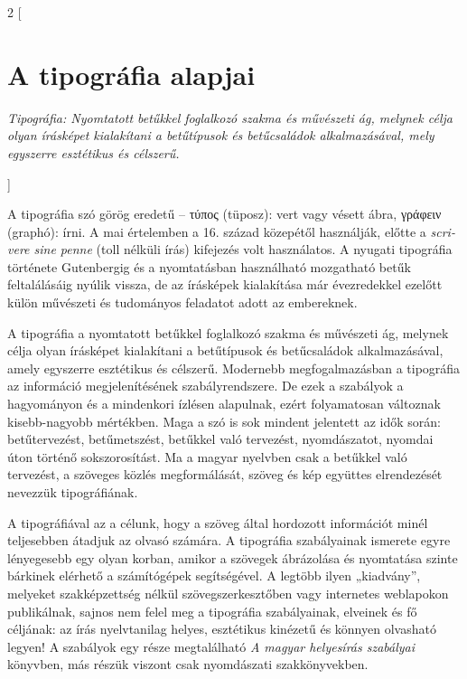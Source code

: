 \documentclass[]{article}
\begin{document}
\begin{multicols}{2}
[
\section{A tipográfia alapjai}
\centering\parbox{0.75\textwidth}{\emph{Tipográfia: Nyomtatott betűkkel foglalkozó szakma és művészeti ág, melynek célja olyan írásképet kialakítani a betűtípusok és betűcsaládok alkalmazásával, mely egyszerre esztétikus és célszerű.}}
]
\justify

A tipográfia szó görög eredetű -- \foreignlanguage{greek}{τύπος} (tüposz): vert vagy vésett ábra, \foreignlanguage{greek}{γράφειν} (graphó): írni. A mai értelemben a 16. század közepétől használják, előtte a \emph{\foreignlanguage{italian}{scrivere sine penne}} (toll nélküli írás) kifejezés volt használatos. A nyugati tipográfia története Gutenbergig és a nyomtatásban használható mozgatható betűk feltalálásáig nyúlik vissza, de az írásképek kialakítása már évezredekkel ezelőtt külön művészeti és tudományos feladatot adott az embereknek.

A tipográfia a nyomtatott betűkkel foglalkozó szakma és művészeti ág, melynek célja olyan írásképet kialakítani a betűtípusok és betűcsaládok alkalmazásával, amely egyszerre esztétikus és célszerű. Modernebb megfogalmazásban a tipográfia az információ megjelenítésének szabályrendszere. De ezek a szabályok a hagyományon és a mindenkori ízlésen alapulnak, ezért folyamatosan változnak kisebb-nagyobb mértékben. Maga a szó is sok mindent jelentett az idők során: betűtervezést, betűmetszést, betűkkel való tervezést, nyomdászatot, nyomdai úton történő sokszorosítást. Ma a magyar nyelvben csak a betűkkel való tervezést, a szöveges közlés megformálását, szöveg és kép együttes elrendezését nevezzük tipográfiának.

A tipográfiával az a célunk, hogy a szöveg által hordozott információt minél teljesebben átadjuk az olvasó számára. A tipográfia szabályainak ismerete egyre lényegesebb egy olyan korban, amikor a szövegek ábrázolása és nyomtatása szinte bárkinek elérhető a számítógépek segítségével. A legtöbb ilyen „kiadvány”, melyeket szakképzettség nélkül szövegszerkesztőben vagy internetes weblapokon publikálnak, sajnos nem felel meg a tipográfia szabályainak, elveinek és fő céljának: az írás nyelvtanilag helyes, esztétikus kinézetű és könnyen olvasható legyen! A szabályok egy része megtalálható \emph{A magyar helyesírás szabályai} könyvben, más részük viszont csak nyomdászati szakkönyvekben.



\end{multicols}
\end{document}
